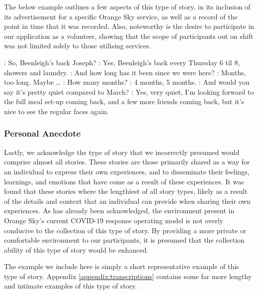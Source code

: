 The below example outlines a few aspects of this type of story, in its inclusion of its advertisement for a specific Orange Sky service, as well as a record of the point in time that it was recorded. Also, noteworthy is the desire to participate in our application as a volunteer, showing that the scope of participants out on shift was not limited solely to those utilising services.

\begin{drama}

    \kelsspeaks: So, Beenleigh's back Joseph?
    \joespeaks: Yes, Beenleigh's back every Thursday 6 til 8, showers and laundry.
    \kelsspeaks: And how long has it been since we were here?
    \joespeaks: Months, too long. Maybe \dots
    \kelsspeaks: How many months?
    \joespeaks: 4 months, 5 months.
    \kelsspeaks: And would you say it's pretty quiet compared to March?
    \joespeaks: Yes, very quiet, I'm looking forward to the full meal set-up coming back, and a few more friends coming back, but it's nice to see the regular faces again.
\end{drama}

\subsubsection{Personal Anecdote}

Lastly, we acknowledge the type of story that we incorrectly presumed would comprise almost all stories. These stories are those primarily shared as a way for an individual to express their own experiences, and to disseminate their feelings, learnings, and emotions that have come as a result of these experiences. It was found that these stories where the lengthiest of all story types, likely as a result of the details and context that an individual can provide when sharing their own experiences. As has already been acknowledged, the environment present in Orange Sky's current COVID-19 response operating model is not overly conducive to the collection of this type of story. By providing a more private or comfortable environment to our participants, it is presumed that the collection ability of this type of story would be enhanced.

The example we include here is simply a short representative example of this type of story. Appendix \ref{appendix:transcriptions} contains some far more lengthy and intimate examples of this type of story.

